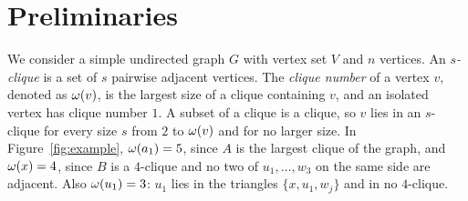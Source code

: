 \section{Preliminaries}\label{sec:prelim}

We consider a simple undirected graph $G$ with vertex set $V$ and $n$ vertices.
%
An \textit{$s$-clique} is a set of $s$ pairwise adjacent vertices.
%
The \textit{clique number} of a vertex $v$, denoted as $\omega(v)$, is the largest size of a clique containing $v$, and an isolated vertex has clique number $1$.
%
A subset of a clique is a clique, so $v$ lies in an $s$-clique for every size $s$ from $2$ to $\omega(v)$ and for no larger size.
%
In Figure~\ref{fig:example}, $\omega(a_1)=5$, since $A$ is the largest clique of the graph, and $\omega(x)=4$, since $B$ is a $4$-clique and no two of $u_1,\dots,w_3$ on the same side are adjacent.
%
Also $\omega(u_1)=3$: $u_1$ lies in the triangles $\{x,u_1,w_j\}$ and in no $4$-clique.

